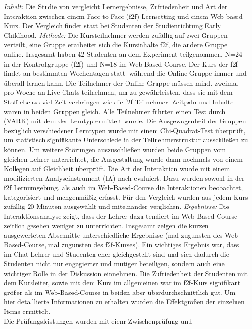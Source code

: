 \emph{Inhalt:} Die Studie von \textcite{mentzer2007two} vergleicht
Lernergebnisse, Zufriedenheit und Art der Interaktion zwischen einem
Face-to Face (f2f) Lernsetting und einem Web-based-Kurs. Der Vergleich
findet statt bei Studenten der Studienrichtung Early Childhood.
\emph{Methode:} Die Kursteilnehmer werden zufällig auf zwei Gruppen
verteilt, eine Gruppe erarbeitet sich die Kursinhalte f2f, die andere
Gruppe online. Insgesamt haben 42 Studenten an dem Experiment
teilgenommen, N=24 in der Kontrollgruppe (f2f) und N=18 im
Web-Based-Course. Der Kurs der f2f findet an bestimmten Wochentagen
statt, während die Online-Gruppe immer und überall lernen kann. Die
Teilnehmer der Online-Gruppe müssen mind. zweimal pro Woche an
Live-Chats teilnehmen, um zu gewährleisten, dass sie mit dem Stoff
ebenso viel Zeit verbringen wie die f2f Teilnehmer. Zeitpaln und Inhalte
waren in beiden Gruppen gleich. Alle Teilnehmer führten einen Test durch
(VARK) mit dem der Lerntyp ermittelt wurde. Die Ausgewogenheit der
Gruppen bezüglich verschiedener Lerntypen wurde mit einem
Chi-Quadrat-Test überprüft, um statistisch signifikante Unterschiede in
der Teilnehmerstruktur ausschließen zu können. Um weitere Störungen
auszuschließen wurden beide Gruppen vom gleichen Lehrer unterrichtet,
die Ausgestaltung wurde dann nochmals von einem Kollegen auf Gleichheit
überprüft. Die Art der Interaktion wurde mit einem modifizierten
Analyseinstrument (IA) nach \textcite{Flanders1961} evaluiert. Dazu
wurden sowohl in der f2f Lernumgebung, als auch im Web-Based-Course die
Interaktionen beobachtet, kategorisiert und mengenmäßig erfasst. Für den
Vergleich wurden aus jedem Kurs zufällig 20 Minuten ausgewählt und
miteinander verglichen. \emph{Ergebnisse:} Die Interaktionsanalyse
zeigt, dass der Lehrer dazu tendiert im Web-Based-Course zeitlich
gesehen weniger zu unterrichten. Insgesamt zeigen die kurzen
ausgewerteten Abschnitte unterschiedliche Ergebnisse (mal zugunsten des
Web-Based-Course, mal zugunsten des f2f-Kurses). Ein wichtiges Ergebnis
war, dass im Chat Lehrer und Studenten eher gleichgestellt sind und sich
dadurch die Studenten nicht nur engagierter und mutiger beteiligen,
sondern auch eine wichtiger Rolle in der Diskussion einnehmen. Die
Zufriedenheit der Studenten mit dem Kursleiter, sowie mit dem Kurs im
allgemeinen war im f2f-Kurs signifikant größer als im Web-Based-Course
in beiden aber überdurchschnittlich gut. Um hier detaillierte
Informationen zu erhalten wurden die Effektgrößen der einzelnen Items
ermittelt.\\Die Prüfungsleistungen wurden mit eienr Zwischenprüfung und

